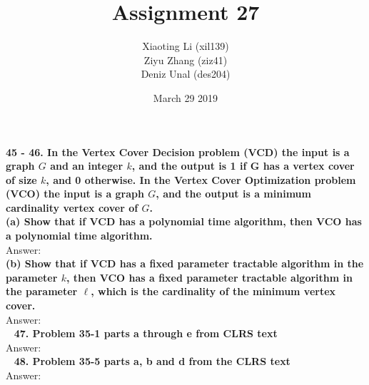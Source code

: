 \documentclass{article}
\title{Assignment 27}
\author{Xiaoting Li (xil139) \\
Ziyu Zhang (ziz41) \\
Deniz Unal (des204)}
\date{March 29 2019}
\begin{document}
\maketitle
\noindent
\textbf{45 - 46. In the Vertex Cover Decision problem (VCD) the input is a graph $G$ and an integer $k$, and the output is 1 if G has a vertex cover of size $k$, and 0 otherwise. In the Vertex Cover Optimization problem (VCO) the input is a graph $G$, and the output is a minimum cardinality vertex cover of $G$.} \\ \newline
\textbf{(a) Show that if VCD has a polynomial time algorithm, then VCO has a polynomial time algorithm.} \\ \newline
Answer: \\ \newline
\textbf{(b) Show that if VCD has a fixed parameter tractable algorithm in the parameter $k$, then VCO has a fixed parameter tractable algorithm in the parameter $\ell$, which is the cardinality of the minimum vertex cover.} \\ \newline
Answer: \\ \newline
\textbf{47. Problem 35-1 parts a through e from CLRS text} \\ \newline
Answer: \\ \newline
\textbf{48. Problem 35-5 parts a, b and d from the CLRS text} \\ \newline
Answer: \\ \newline
\end{document}
